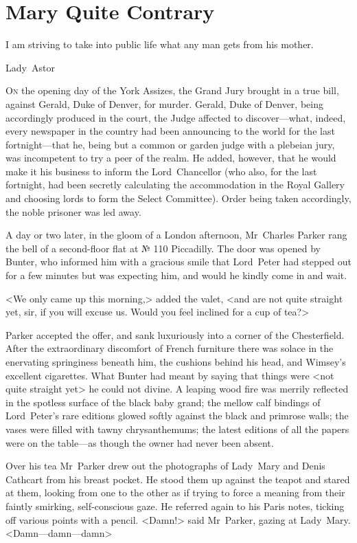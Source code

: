 \chapter{Mary Quite Contrary}

\epigraph{I am striving to take into public life what any man gets from his mother.}{Lady~Astor}


\lettrine{O}{n} the opening day of the York Assizes, the Grand Jury brought in a true bill, against Gerald, Duke of Denver, for murder. Gerald, Duke of Denver, being accordingly produced in the court, the Judge affected to discover—what, indeed, every newspaper in the country had been announcing to the world for the last fortnight—that he, being but a common or garden judge with a plebeian jury, was incompetent to try a peer of the realm. He added, however, that he would make it his business to inform the Lord~Chancellor (who also, for the last fortnight, had been secretly calculating the accommodation in the Royal Gallery and choosing lords to form the Select Committee). Order being taken accordingly, the noble prisoner was led away.


\divider


A day or two later, in the gloom of a London afternoon, Mr~Charles Parker rang the bell of a second-floor flat at № 110 Piccadilly. The door was opened by Bunter, who informed him with a gracious smile that Lord~Peter had stepped out for a few minutes but was expecting him, and would he kindly come in and wait.

<We only came up this morning,> added the valet, <and are not quite straight yet, sir, if you will excuse us. Would you feel inclined for a cup of tea?>

Parker accepted the offer, and sank luxuriously into a corner of the Chesterfield. After the extraordinary discomfort of French furniture there was solace in the enervating springiness beneath him, the cushions behind his head, and Wimsey's excellent cigarettes. What Bunter had meant by saying that things were <not quite straight yet> he could not divine. A leaping wood fire was merrily reflected in the spotless surface of the black baby grand; the mellow calf bindings of Lord~Peter's rare editions glowed softly against the black and primrose walls; the vases were filled with tawny chrysanthemums; the latest editions of all the papers were on the table—as though the owner had never been absent.

Over his tea Mr~Parker drew out the photographs of Lady~Mary and Denis Cathcart from his breast pocket. He stood them up against the teapot and stared at them, looking from one to the other as if trying to force a meaning from their faintly smirking, self-conscious gaze. He referred again to his Paris notes, ticking off various points with a pencil.  <Damn!> said Mr~Parker, gazing at Lady~Mary. <Damn—damn—damn\longdash>

